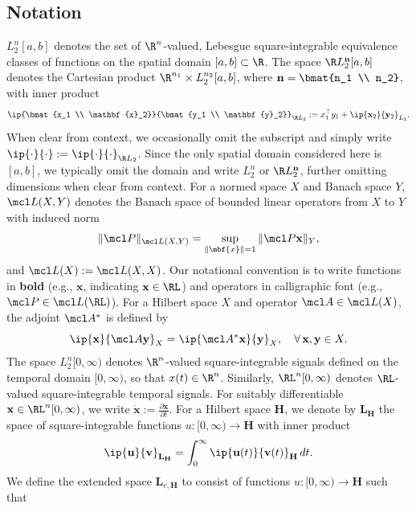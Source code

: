 \subsection{Notation}
$L_2^n[a,b]$ denotes the set of $\R^n$-valued, Lebesgue square-integrable equivalence classes of functions on the spatial domain $[a,b]\subset\R$. The space $\R L_2^{\mathbf{n}}[a,b]$ denotes the Cartesian product $\R^{n_1} \times L_2^{n_2}[a,b]$, where $\mathbf{n} = \bmat{n_1 \\ n_2}$, with inner product
\begin{equation*}
	\ip{\bmat{x_1 \\ \mathbf{x}_2}}{\bmat{y_1 \\ \mathbf{y}_2}}_{\R L_2}
	:= x_1^\top y_1 + \ip{\mathbf{x}_2}{\mathbf{y}_2}_{L_2}.
\end{equation*} When clear from context, we occasionally omit the subscript and simply write $\ip{\cdot}{\cdot} := \ip{\cdot}{\cdot}_{\R L_2}$. Since the only spatial domain considered here is $[a,b]$, we typically omit the domain and write $L_2^n$ or $\R L_2^{\mathbf{n}}$, further omitting dimensions when clear from context. For a normed space $X$ and Banach space $Y$, $\mcl L(X,Y)$ denotes the Banach space of bounded linear operators from $X$ to $Y$ with induced norm
\[
	\|\mcl P\|_{\mcl L(X,Y)} = \sup_{\|\mbf{x}\| = 1} \|\mcl P \mathbf{x}\|_Y,
\] and $\mcl L(X) := \mcl L(X,X)$. Our notational convention is to write functions in \textbf{bold} (e.g., $\mathbf{x}$, indicating $\mathbf{x} \in \RL$) and operators in calligraphic font (e.g., $\mcl P \in \mcl L(\RL)$).
For a Hilbert space $X$ and operator $\mcl A \in \mcl L(X)$, the adjoint $\mcl A^*$ is defined by
\[
	\ip{\mathbf{x}}{\mcl A \mathbf{y}}_X = \ip{\mcl A^* \mathbf{x}}{\mathbf{y}}_X,
	\quad \forall\, \mathbf{x},\mathbf{y} \in X.
\] The space $L_2^n[0,\infty)$ denotes $\R^n$-valued square-integrable signals defined on the temporal domain $[0,\infty)$, so that $x(t) \in \R^n$. Similarly, $\RL^n[0,\infty)$ denotes $\RL$-valued square-integrable temporal signals. For suitably differentiable $\mathbf{x} \in \RL^n[0,\infty)$, we write $\mathbf{\dot{x}} := \frac{\partial \mathbf{x}}{\partial t}$. For a Hilbert space $\mathbf{H}$, we denote by $\mathbf{L}_{\mathbf{H}}$ the space of square-integrable functions $u : [0,\infty) \to \mathbf{H}$ with inner product
\[
	\ip{\mathbf{u}}{\mathbf{v}}_{\mathbf{L}_{\mathbf{H}}}
	= \int_0^\infty \ip{\mathbf{u}(t)}{\mathbf{v}(t)}_{\mathbf{H}}\, dt.
\] We define the extended space $\mathbf{L}_{e,\mathbf{H}}$ to consist of functions $u : [0,\infty) \to \mathbf{H}$ such that
